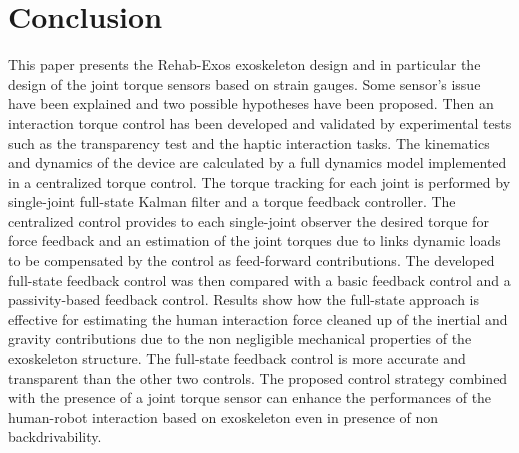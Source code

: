 \section{Conclusion} \label{sec:conclusion}
This paper presents the Rehab-Exos exoskeleton design and in particular the design of the joint torque sensors based on strain gauges. Some sensor's issue have been explained and two possible hypotheses have been proposed. Then an interaction torque control has been developed and validated by experimental tests such as the transparency test and the haptic interaction tasks. The kinematics and dynamics of the device are calculated by a full dynamics model implemented in a centralized torque control. The torque tracking for each joint is performed by single-joint full-state Kalman filter and a torque feedback controller. The centralized control provides to each single-joint observer the desired torque for force feedback and an estimation of the joint torques due to links dynamic loads to be compensated by the control as feed-forward contributions. The developed full-state feedback control was then compared with a basic feedback control and a passivity-based feedback control. Results show how the  full-state approach is effective for estimating the human interaction force cleaned up of the inertial and gravity contributions due to the non negligible mechanical properties of the exoskeleton structure. The full-state feedback control is more accurate and transparent than the other two controls. The proposed control strategy combined with the presence of a joint torque sensor can enhance the performances of the human-robot interaction based on exoskeleton even in presence of non backdrivability. %
